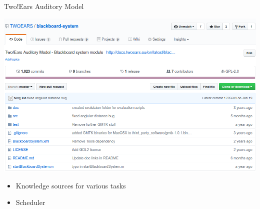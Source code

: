 \documentclass{beamer}
\begin{document}
\begin{frame}{Two!Ears Auditory Model}
\begin{minipage}[b]{0.56\columnwidth}
        \centering
        \includegraphics[width=.9\textwidth]{fig/blackboard-system}

        \begin{itemize}
            \item Knowledge sources for various tasks
            \item Scheduler
        \end{itemize}

    \end{minipage}

\end{frame}
\end{document}
